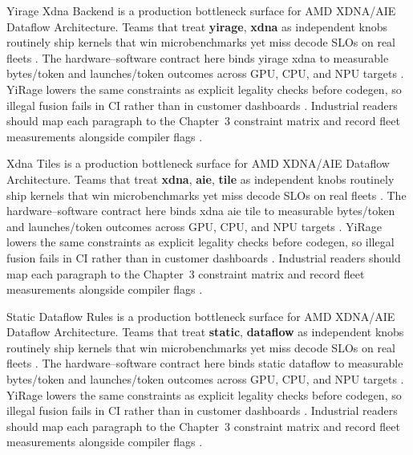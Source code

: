 Yirage Xdna Backend is a production bottleneck surface for AMD XDNA/AIE Dataflow Architecture. Teams that treat \textbf{yirage}, \textbf{xdna} as independent knobs routinely ship kernels that win microbenchmarks yet miss decode SLOs on real fleets \citep{amd2024xdna,dao2022flashattention}. The hardware--software contract here binds yirage xdna to measurable bytes/token and launches/token outcomes across GPU, CPU, and NPU targets \citep{amd2024aie,kwon2023vllm}. YiRage lowers the same constraints as explicit legality checks before codegen, so illegal fusion fails in CI rather than in customer dashboards \citep{dlbook,nvidia2024cudagraphs}. Industrial readers should map each paragraph to the Chapter~3 constraint matrix and record fleet measurements alongside compiler flags \citep{dao2022flashattention,liu2024deepseekv3}.

Xdna Tiles is a production bottleneck surface for AMD XDNA/AIE Dataflow Architecture. Teams that treat \textbf{xdna}, \textbf{aie}, \textbf{tile} as independent knobs routinely ship kernels that win microbenchmarks yet miss decode SLOs on real fleets \citep{amd2024aie,kwon2023vllm}. The hardware--software contract here binds xdna aie tile to measurable bytes/token and launches/token outcomes across GPU, CPU, and NPU targets \citep{dlbook,nvidia2024cudagraphs}. YiRage lowers the same constraints as explicit legality checks before codegen, so illegal fusion fails in CI rather than in customer dashboards \citep{dao2022flashattention,liu2024deepseekv3}. Industrial readers should map each paragraph to the Chapter~3 constraint matrix and record fleet measurements alongside compiler flags \citep{kwon2023vllm,patel2025llminference}.

Static Dataflow Rules is a production bottleneck surface for AMD XDNA/AIE Dataflow Architecture. Teams that treat \textbf{static}, \textbf{dataflow} as independent knobs routinely ship kernels that win microbenchmarks yet miss decode SLOs on real fleets \citep{dlbook,nvidia2024cudagraphs}. The hardware--software contract here binds static dataflow to measurable bytes/token and launches/token outcomes across GPU, CPU, and NPU targets \citep{dao2022flashattention,liu2024deepseekv3}. YiRage lowers the same constraints as explicit legality checks before codegen, so illegal fusion fails in CI rather than in customer dashboards \citep{kwon2023vllm,patel2025llminference}. Industrial readers should map each paragraph to the Chapter~3 constraint matrix and record fleet measurements alongside compiler flags \citep{nvidia2024cudagraphs,taxbreak2026}.


